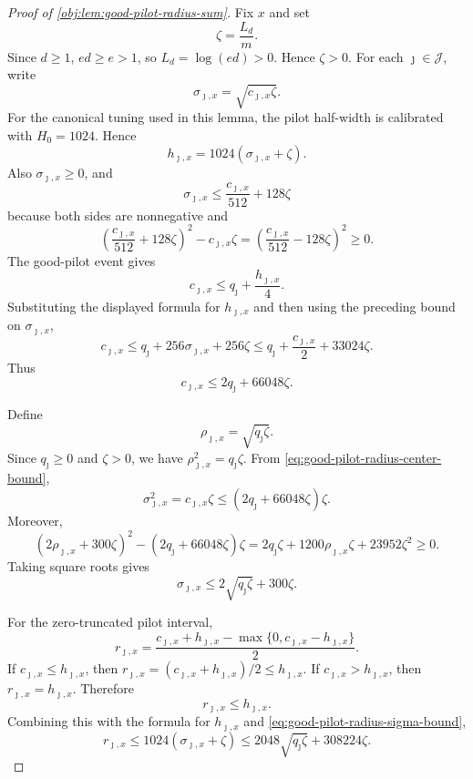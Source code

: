 \begin{proof}[Proof of \cref{obj:lem:good-pilot-radius-sum}]
Fix \(x\) and set
\[
\zeta=\frac{L_d}{m}.
\]
Since \(d\ge 1\), \(ed\ge e>1\), so \(L_d=\log(ed)>0\). Hence \(\zeta>0\). For each \(\jmath\in\mathcal J\), write
\[
\sigma_{\jmath,x}=\sqrt{c_{\jmath,x}\zeta}.
\]
For the canonical tuning used in this lemma, the pilot half-width is calibrated with \(H_0=1024\). Hence
\[
h_{\jmath,x}=1024(\sigma_{\jmath,x}+\zeta).
\]
Also \(\sigma_{\jmath,x}\ge0\), and
\[
\sigma_{\jmath,x}\le \frac{c_{\jmath,x}}{512}+128\zeta
\]
because both sides are nonnegative and
\[
\left(\frac{c_{\jmath,x}}{512}+128\zeta\right)^2-c_{\jmath,x}\zeta
=
\left(\frac{c_{\jmath,x}}{512}-128\zeta\right)^2\ge0 .
\]
The good-pilot event gives
\[
c_{\jmath,x}\le q_\jmath+\frac{h_{\jmath,x}}4 .
\]
Substituting the displayed formula for \(h_{\jmath,x}\) and then using the preceding bound on
\(\sigma_{\jmath,x}\),
\[
c_{\jmath,x}
\le q_\jmath+256\sigma_{\jmath,x}+256\zeta
\le q_\jmath+\frac{c_{\jmath,x}}2+33024\zeta .
\]
Thus
\begin{equation}\label{eq:good-pilot-radius-center-bound}
c_{\jmath,x}\le 2q_\jmath+66048\zeta .
\end{equation}

Define
\[
\rho_{\jmath,x}=\sqrt{q_\jmath\zeta}.
\]
Since \(q_\jmath\ge0\) and \(\zeta>0\), we have \(\rho_{\jmath,x}^2=q_\jmath\zeta\). From \cref{eq:good-pilot-radius-center-bound},
\[
\sigma_{\jmath,x}^2
=
c_{\jmath,x}\zeta
\le
(2q_\jmath+66048\zeta)\zeta .
\]
Moreover,
\[
(2\rho_{\jmath,x}+300\zeta)^2-(2q_\jmath+66048\zeta)\zeta
=
2q_\jmath\zeta+1200\rho_{\jmath,x}\zeta+23952\zeta^2
\ge0 .
\]
Taking square roots gives
\begin{equation}\label{eq:good-pilot-radius-sigma-bound}
\sigma_{\jmath,x}\le 2\sqrt{q_\jmath\zeta}+300\zeta .
\end{equation}

For the zero-truncated pilot interval,
\[
r_{\jmath,x}
=
\frac{c_{\jmath,x}+h_{\jmath,x}-\max\{0,c_{\jmath,x}-h_{\jmath,x}\}}2 .
\]
If \(c_{\jmath,x}\le h_{\jmath,x}\), then \(r_{\jmath,x}=(c_{\jmath,x}+h_{\jmath,x})/2\le h_{\jmath,x}\). If
\(c_{\jmath,x}>h_{\jmath,x}\), then \(r_{\jmath,x}=h_{\jmath,x}\). Therefore
\[
r_{\jmath,x}\le h_{\jmath,x}.
\]
Combining this with the formula for \(h_{\jmath,x}\) and \cref{eq:good-pilot-radius-sigma-bound},
\begin{equation}\label{eq:good-pilot-radius-coordinate-bound}
r_{\jmath,x}
\le
1024(\sigma_{\jmath,x}+\zeta)
\le
2048\sqrt{q_\jmath\zeta}+308224\zeta .
\end{equation}


\end{proof}
